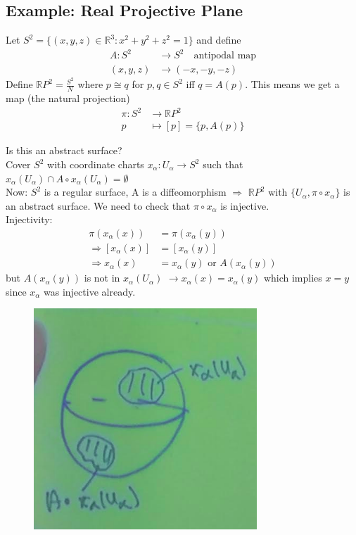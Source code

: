 \documentclass[a4paper, 11pt]{article}
\begin{document}
	
	
	
\subsection*{Example: Real Projective Plane}	
	Let $S^2 = \{(x,y,z)\in \mathbb{R}^3 : x^2+y^2+z^2=1\}$ and define 
		\begin{align*}
			A:S^2&\to S^2 \quad \text{antipodal map} \\ 
			(x,y,z)&\to (-x,-y,-z) 
		\end{align*}
	Define $\mathbb{R}P^2 = \frac{S^2}{N}$ where $p\cong q$ for $p,q \in S^2$ iff $q = A(p)$. This means we get a map (the natural projection)
		\begin{align*}
			\pi:S^2 &\to \mathbb{R}P^2 \\ 
			p&\mapsto [p] = \{p, A(p)\}
		\end{align*} 
	
	\noindent Is this an abstract surface? \\ 
	
	\noindent Cover $S^2$ with coordinate charts $x_\alpha:U_\alpha\to S^2$ such that $x_\alpha(U_\alpha)\cap A\circ x_\alpha(U_\alpha) = \emptyset$  \\ 
	
	\noindent Now: $S^2$ is a regular surface, A is a diffeomorphism $\Rightarrow$ $\mathbb{R}P^2$ with $\{U_\alpha, \pi\circ x_\alpha\}$ is an abstract surface. We need to check that $\pi\circ x_\alpha$ is injective. \\ 
	
	\noindent Injectivity:
		\begin{align*}
			\pi(x_\alpha(x)) &= \pi(x_\alpha(y)) \\
			 \Rightarrow [x_\alpha(x)] &= [x_\alpha(y)] \\
			 \Rightarrow x_\alpha(x) &= x_\alpha(y) \text{ or } A(x_\alpha(y))
		\end{align*} 
		but $A(x_\alpha(y))$ is not in $x_\alpha(U_\alpha)$ $\rightarrow x_\alpha(x) = x_\alpha(y)$ which implies $x = y$ since $x_\alpha$ was injective already. 
	
	\begin{figure}[!hbt]
		\centering 
		\includegraphics[width=0.5\columnwidth]{antipodal}
	\end{figure}
\end{document}
